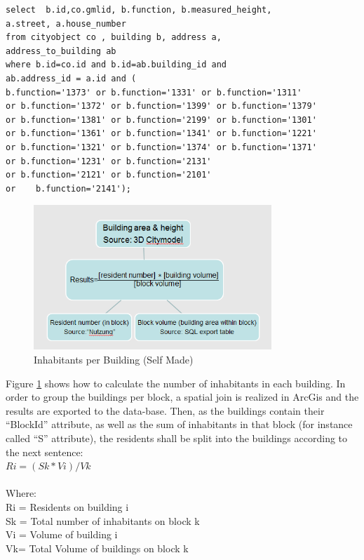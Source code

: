 \begin{lstlisting}
select  b.id,co.gmlid, b.function, b.measured_height,
a.street, a.house_number
from cityobject co , building b, address a, 
address_to_building ab
where b.id=co.id and b.id=ab.building_id and 
ab.address_id = a.id and (
b.function='1373' or b.function='1331' or b.function='1311'
or b.function='1372' or b.function='1399' or b.function='1379'
or b.function='1381' or b.function='2199' or b.function='1301'
or b.function='1361' or b.function='1341' or b.function='1221' 
or b.function='1321' or b.function='1374' or b.function='1371'
or b.function='1231' or b.function='2131'  
or b.function='2121' or b.function='2101'   
or    b.function='2141');
\end{lstlisting}

\begin{figure}[ht]
	\centering
	\includegraphics[width=0.8\textwidth]{phase1/group3/fig4.png}
	\caption{Inhabitants per Building (Self Made)}
	\label{fig:figure4}
\end{figure}


Figure \ref{fig:figure4} shows how to calculate the number of inhabitants in each building. In order to group the buildings per block, a spatial join is realized in ArcGis and the results are exported to the data-base. Then, as the buildings contain their “BlockId” attribute, as well as the sum of inhabitants in that block (for instance called “S” attribute), the residents shall be split into the buildings according to the next sentence:\\


$Ri= (Sk*Vi)/Vk$\\
\\
Where:\\
		Ri = Residents on building i\\
		Sk = Total number of inhabitants on block k\\
		Vi = Volume of building i\\
		Vk= Total Volume of buildings on block k

